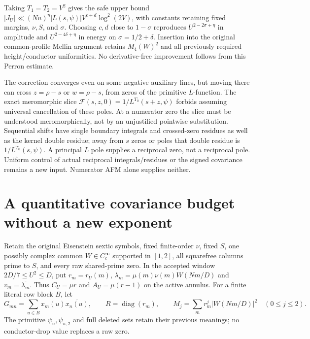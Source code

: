 \documentclass[11pt,oneside,openany]{book}
\theoremstyle{definition}\newtheorem{definition}[theorem]{Definition}
\theoremstyle{remark}\newtheorem{remark}[theorem]{Remark}
\begin{document}
Taking $T_1=T_2=V^2$ gives the safe upper bound
$|J_U|\ll (Nu)^\eta |L(s,\psi)|V^{c+d}\log^2(2V)$, with constants
retaining fixed margins, $\nu,S$, and $\sigma$. Choosing $c,d$ close to
$1-\sigma$ reproduces $U^{2-2\sigma+\eta}$ in amplitude and
$U^{2-4\delta+\eta}$ in energy on $\sigma=1/2+\delta$.
Insertion into the original common-profile Mellin argument retains
$M_4(W)^2$ and all previously required height/conductor uniformities.
No derivative-free improvement follows from this Perron estimate.

The correction converges even on some negative auxiliary lines, but
moving there can cross $z=\rho-s$ or $w=\rho-s$, from zeros of the
primitive $L$-function. The exact meromorphic slice
$\mathcal F(s,z,0)=1/L^{T_0}(s+z,\psi)$ forbids assuming universal
cancellation of these poles. At a numerator zero the slice must be
understood meromorphically, not by an unjustified pointwise substitution.
Sequential shifts have single boundary integrals and crossed-zero
residues as well as the kernel double residue; away from $s$ zeros or
poles that double residue is $1/L^{T_0}(s,\psi)$.
A principal $L$ pole supplies a reciprocal zero, not a reciprocal pole.
Uniform control of actual reciprocal integrals/residues or the signed
covariance remains a new input. Numerator AFM alone supplies neither.

\section{A quantitative covariance budget without a new exponent}\label{cbq:core}
Retain the original Eisenstein sextic symbols, fixed finite-order $\nu$,
fixed $S$, one possibly complex common $W\in C_c^\infty$ supported in
$[1,2]$, all squarefree columns prime to $S$, and every raw shared-prime
zero. In the accepted window $2D/7\le U^2\le D$, put $r_m=r_U(m)$,
$\lambda_m=\mu(m)\nu(m)W(Nm/D)$ and $v_m=\overline{\lambda_m}$.
Thus $C_U=\mu r$ and $A_U=\mu(r-1)$ on the active annulus.
For a finite literal row block $B$, let
\[
 G_{mn}=\sum_{u\in B}x_m(u)\overline{x_n(u)},\qquad
 R=\operatorname{diag}(r_m),\qquad
 M_j=\sum_mr_m^j|W(Nm/D)|^2\quad(0\le j\le2).
\]
The primitive $\psi_u,\psi_{u,2}$ and full deleted sets retain their
previous meanings; no conductor-drop value replaces a raw zero.
\end{document}
